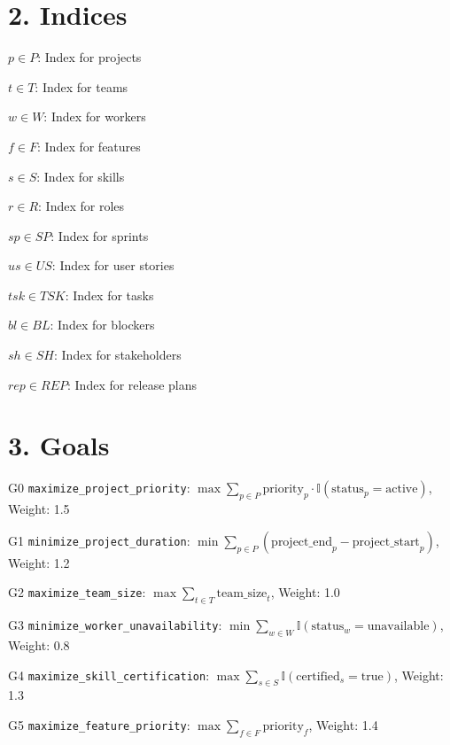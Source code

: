 \documentclass[12pt]{article}
\begin{document}
\section{2. Indices}
\item $p \in P$: Index for projects
    \item $t \in T$: Index for teams
    \item $w \in W$: Index for workers
    \item $f \in F$: Index for features
    \item $s \in S$: Index for skills
    \item $r \in R$: Index for roles
    \item $sp \in SP$: Index for sprints
    \item $us \in US$: Index for user stories
    \item $tsk \in TSK$: Index for tasks
    \item $bl \in BL$: Index for blockers
    \item $sh \in SH$: Index for stakeholders
    \item $rep \in REP$: Index for release plans

\section{3. Goals}
\item[G0] \texttt{maximize\_project\_priority}: 
    $\max \sum_{p \in P} \text{priority}_p \cdot \mathbb{I}(\text{status}_p = \text{active})$, Weight: 1.5
    
    \item[G1] \texttt{minimize\_project\_duration}: 
    $\min \sum_{p \in P} (\text{project\_end}_p - \text{project\_start}_p)$, Weight: 1.2
    
    \item[G2] \texttt{maximize\_team\_size}: 
    $\max \sum_{t \in T} \text{team\_size}_t$, Weight: 1.0
    
    \item[G3] \texttt{minimize\_worker\_unavailability}: 
    $\min \sum_{w \in W} \mathbb{I}(\text{status}_w = \text{unavailable})$, Weight: 0.8
    
    \item[G4] \texttt{maximize\_skill\_certification}: 
    $\max \sum_{s \in S} \mathbb{I}(\text{certified}_s = \text{true})$, Weight: 1.3
    
    \item[G5] \texttt{maximize\_feature\_priority}: 
    $\max \sum_{f \in F} \text{priority}_f$, Weight: 1.4
    
\end{document}

